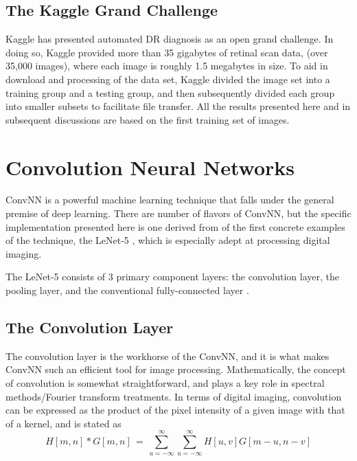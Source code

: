 \documentclass[letterpaper,12pt]{article}
\begin{document}
\subsection{The Kaggle Grand Challenge}

Kaggle has presented automated DR diagnosis as an open grand challenge. In doing so, Kaggle provided more than 35 gigabytes of retinal scan data, (over 35,000 images), where each image is roughly 1.5 megabytes in size. To aid in download and processing of the data set, Kaggle divided the image set into a training group and a testing group, and then subsequently divided each group into smaller subsets to facilitate file transfer. All the results presented here and in subsequent discussions are based on the first training set of images.	

\section{Convolution Neural Networks}

ConvNN is a powerful machine learning technique that falls under the general premise of deep learning. There are number of flavors of ConvNN, but the specific implementation presented here is one derived from of the first concrete examples of the technique, the LeNet-5 \cite{LeNet}, which is especially adept at processing digital imaging.

The LeNet-5 consists of 3 primary component layers: the convolution layer, the pooling layer, and the conventional fully-connected layer \cite{deep}. 

\subsection{The Convolution Layer}

The convolution layer is the workhorse of the ConvNN, and it is what makes ConvNN such an efficient tool for image processing. Mathematically, the concept of convolution is somewhat straightforward, and plays a key role in spectral methods/Fourier transform treatments. In terms of digital imaging, convolution can be expressed as \cite{deep} the product of the pixel intensity of a given image with that of a kernel, and is stated as
\begin{equation}
H[m,n] * G[m,n] \, = \, \sum_{u=- \infty}^{\infty} \sum_{u=- \infty}^{\infty} H[u,v] G[m-u, n-v]
\end{equation}
\end{document}
